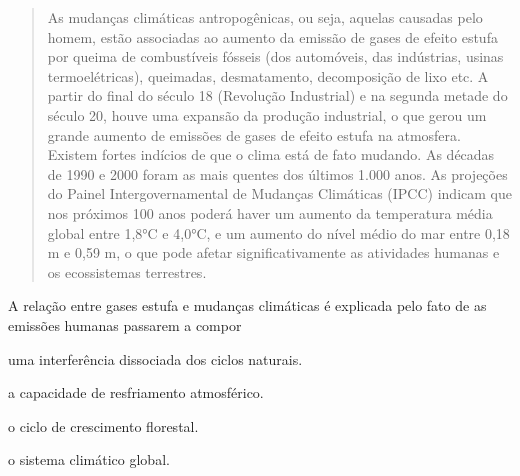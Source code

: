 \begin{quote}
As mudanças climáticas antropogênicas, ou seja, aquelas causadas
pelo homem, estão associadas ao aumento da emissão de gases de efeito
estufa por queima de combustíveis fósseis (dos automóveis, das
indústrias, usinas termoelétricas), queimadas, desmatamento,
decomposição de lixo etc. A partir do final do século 18 (Revolução
Industrial) e na segunda metade do século 20, houve uma expansão da
produção industrial, o que gerou um grande aumento de emissões de gases
de efeito estufa na atmosfera. Existem fortes indícios de que o clima
está de fato mudando. As décadas de 1990 e 2000 foram as mais quentes
dos últimos 1.000 anos. As projeções do Painel Intergovernamental de
Mudanças Climáticas (IPCC) indicam que nos próximos 100 anos poderá
haver um aumento da temperatura média global entre 1,8°C e 4,0°C, e um
aumento do nível médio do mar entre 0,18 m e 0,59 m, o que pode afetar
significativamente as atividades humanas e os ecossistemas terrestres.

\end{quote}

A relação entre gases estufa e mudanças climáticas é explicada pelo fato
de as emissões humanas passarem a compor

\begin{escolha}
\item
  uma interferência dissociada dos ciclos naturais.
\item
  a capacidade de resfriamento atmosférico.
\item
  o ciclo de crescimento florestal.
\item
  o sistema climático global.
\end{escolha}

